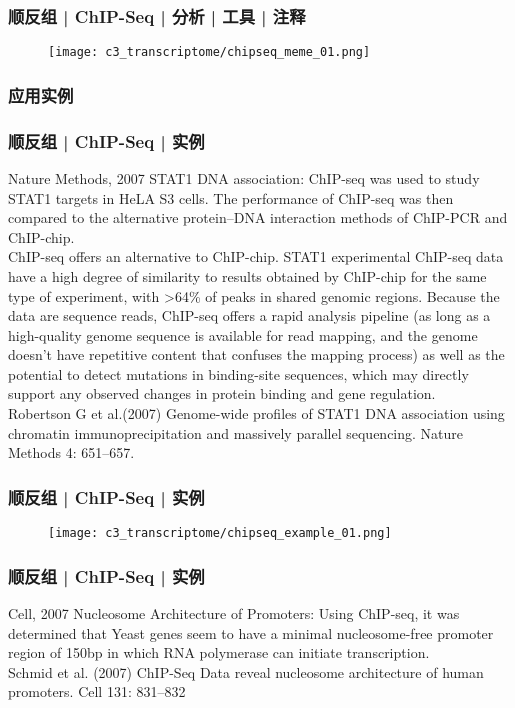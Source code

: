 \begin{frame}
  \frametitle{顺反组 | ChIP-Seq | 分析 | 工具 | 注释}
  \begin{figure}
    \centering
    \texttt{[image: c3\_transcriptome/chipseq\_meme\_01.png]}
  \end{figure}
\end{frame}

\subsubsection{应用实例}
\begin{frame}
  \frametitle{顺反组 | ChIP-Seq | 实例}
  {\footnotesize
    \begin{block}{Nature Methods, 2007}
  STAT1 DNA association: ChIP-seq was used to study STAT1 targets in HeLA S3 cells. The performance of ChIP-seq was then compared to the alternative protein–DNA interaction methods of ChIP-PCR and ChIP-chip.\\
  \vspace{0.5em}
  ChIP-seq offers an alternative to ChIP-chip. STAT1 experimental ChIP-seq data have a high degree of similarity to results obtained by ChIP-chip for the same type of experiment, with >64\% of peaks in shared genomic regions. Because the data are sequence reads, ChIP-seq offers a rapid analysis pipeline (as long as a high-quality genome sequence is available for read mapping, and the genome doesn't have repetitive content that confuses the mapping process) as well as the potential to detect mutations in binding-site sequences, which may directly support any observed changes in protein binding and gene regulation.\\
  \vspace{0.5em}
  Robertson G et al.(2007) Genome-wide profiles of STAT1 DNA association using chromatin immunoprecipitation and massively parallel sequencing. Nature Methods 4: 651–657.
    \end{block}
}
\end{frame}

\begin{frame}
  \frametitle{顺反组 | ChIP-Seq | 实例}
  \begin{figure}
    \centering
    \texttt{[image: c3\_transcriptome/chipseq\_example\_01.png]}
  \end{figure}
\end{frame}

\begin{frame}
  \frametitle{顺反组 | ChIP-Seq | 实例}
  \begin{block}{Cell, 2007}
  Nucleosome Architecture of Promoters: Using ChIP-seq, it was determined that Yeast genes seem to have a minimal nucleosome-free promoter region of 150bp in which RNA polymerase can initiate transcription.\\
  \vspace{0.5em}
  Schmid et al. (2007) ChIP-Seq Data reveal nucleosome architecture of human promoters. Cell 131: 831–832
  \end{block}
\end{frame}

